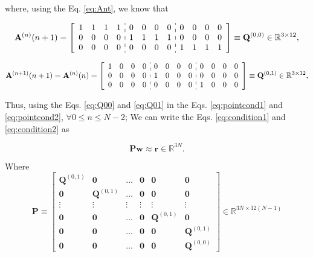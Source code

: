 where, using the Eq. \ref{eq:Ant}, we know that

\begin{equation}\label{eq:Q00}
\mathbf{A}^{(n)}(n+1)=
\left[
\begin{array}{cccc:cccc:cccc}
1 & 1 & 1 & 1 &
0 & 0 & 0 & 0 &
0 & 0 & 0 & 0 \\
0 & 0 & 0 & 0 &
1 & 1 & 1 & 1 &
0 & 0 & 0 & 0 \\
0 & 0 & 0 & 0 &
0 & 0 & 0 & 0 &
1 & 1 & 1 & 1 
\end{array}
\right]
\equiv \mathbf{Q}^{(0,0)}\in \mathbb{R}^{3\times 12},
\end{equation}

\begin{equation}\label{eq:Q01}
\mathbf{A}^{(n+1)}(n+1)
=
\mathbf{A}^{(n)}(n)
=
\left[
\begin{array}{cccc:cccc:cccc}
1 & 0 & 0 & 0 &
0 & 0 & 0 & 0 &
0 & 0 & 0 & 0 \\
0 & 0 & 0 & 0 &
1 & 0 & 0 & 0 &
0 & 0 & 0 & 0 \\
0 & 0 & 0 & 0 &
0 & 0 & 0 & 0 &
1 & 0 & 0 & 0 
\end{array}
\right]
\equiv \mathbf{Q}^{(0,1)}\in \mathbb{R}^{3\times 12},
\end{equation}

Thus,
using the Eqs. \ref{eq:Q00} and \ref{eq:Q01} in 
the Eqs. \ref{eq:pointcond1} and \ref{eq:pointcond2}, 
$\forall 0 \leq n\leq N-2$;
We can write the Eqs. \ref{eq:condition1} and \ref{eq:condition2} as 

\begin{equation}
\mathbf{P}
\mathbf{w}
\approx \mathbf{r}\in \mathbb{R}^{3N}.
\end{equation}

Where
\begin{equation}\label{eq:Pmat}
\mathbf{P}
\equiv
\begin{bmatrix}
\mathbf{Q}^{(0,1)} & \mathbf{0}         & \hdots & \mathbf{0} & \mathbf{0}         & \mathbf{0}\\
\mathbf{0}         & \mathbf{Q}^{(0,1)} & \hdots & \mathbf{0} & \mathbf{0}         & \mathbf{0}\\
\vdots             & \vdots             & \vdots & \vdots     & \vdots             & \vdots    \\ 
\mathbf{0}         & \mathbf{0}         & \hdots & \mathbf{0} & \mathbf{Q}^{(0,1)} & \mathbf{0}\\
\mathbf{0}         & \mathbf{0}         & \hdots & \mathbf{0} & \mathbf{0}         & \mathbf{Q}^{(0,1)}\\
\mathbf{0}         & \mathbf{0}         & \hdots & \mathbf{0} & \mathbf{0}         & \mathbf{Q}^{(0,0)}
\end{bmatrix}
\in \mathbb{R}^{3N\times 12(N-1)}
\end{equation}

